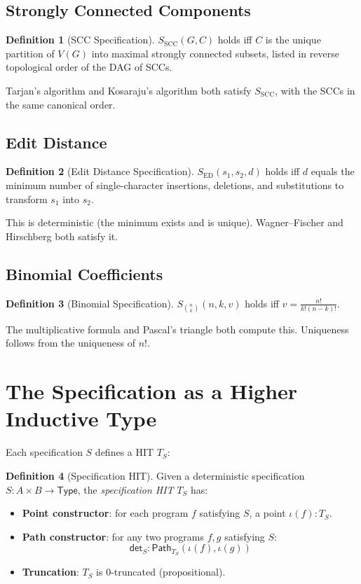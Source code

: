 \documentclass[11pt,a4paper]{report}
\theoremstyle{definition}
\newtheorem{definition}{Definition}[chapter]
\theoremstyle{plain}
\newcommand{\Path}{\mathsf{Path}}
\newcommand{\Type}{\mathsf{Type}}
\begin{document}
\subsection{Strongly Connected Components}

\begin{definition}[SCC Specification]
$S_{\mathrm{SCC}}(G, C)$ holds iff $C$ is the unique partition of
$V(G)$ into maximal strongly connected subsets, listed in reverse
topological order of the DAG of SCCs.
\end{definition}

Tarjan's algorithm and Kosaraju's algorithm both satisfy
$S_{\mathrm{SCC}}$, with the SCCs in the same canonical order.

\subsection{Edit Distance}

\begin{definition}[Edit Distance Specification]
$S_{\mathrm{ED}}(s_1, s_2, d)$ holds iff $d$ equals the minimum
number of single-character insertions, deletions, and substitutions
to transform $s_1$ into $s_2$.
\end{definition}

This is deterministic (the minimum exists and is unique).
Wagner--Fischer and Hirschberg both satisfy it.

\subsection{Binomial Coefficients}

\begin{definition}[Binomial Specification]
$S_{\binom{n}{k}}(n, k, v)$ holds iff $v = \frac{n!}{k!(n-k)!}$.
\end{definition}

The multiplicative formula and Pascal's triangle both compute this.
Uniqueness follows from the uniqueness of $n!$.

\section{The Specification as a Higher Inductive Type}

Each specification $S$ defines a HIT $T_S$:

\begin{definition}[Specification HIT]
Given a deterministic specification $S : A \times B \to \Type$,
the \emph{specification HIT} $T_S$ has:
\begin{itemize}
  \item \textbf{Point constructor}: for each program $f$ satisfying
    $S$, a point $\iota(f) : T_S$.
  \item \textbf{Path constructor}: for any two programs $f, g$
    satisfying $S$:
    \[
      \mathsf{det}_S : \Path_{T_S}(\iota(f), \iota(g))
    \]
  \item \textbf{Truncation}: $T_S$ is 0-truncated (propositional).
\end{itemize}
\end{definition}
\end{document}
